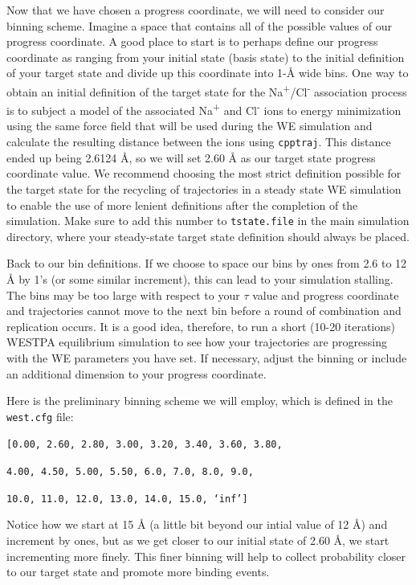 \documentclass[9pt,tutorial]{livecoms}
\begin{document}
Now that we have chosen a progress coordinate, we will need to consider our binning scheme. 
Imagine a space that contains all of the possible values of our progress coordinate. 
A good place to start is to perhaps define our progress coordinate as ranging from your initial state (basis state) to the initial definition of your target state and divide up this coordinate into 1-\AA{} wide bins. 
One way to obtain an initial definition of the target state for the Na\textsuperscript{+}/Cl\textsuperscript{-} association process is to subject a model of the associated Na\textsuperscript{+} and Cl\textsuperscript{-} ions to energy minimization using the same force field that will be used during the WE simulation and calculate the resulting distance between the ions using \verb|cpptraj|. 
This distance ended up being 2.6124 \AA{}, so we will set 2.60 \AA{} as our target state progress coordinate value. 
We recommend choosing the most strict definition possible for the target state for the recycling of trajectories in a steady state WE simulation to enable the use of more lenient definitions after the completion of the simulation. 
Make sure to add this number to \verb|tstate.file| in the main simulation directory, where your steady-state target state definition should always be placed.

Back to our bin definitions. 
If we choose to space our bins by ones from 2.6 to 12 \AA{} by 1’s (or some similar increment), this can lead to your simulation stalling. 
The bins may be too large with respect to your $\tau$ value and progress coordinate and trajectories cannot move to the next bin before a round of combination and replication occurs. 
It is a good idea, therefore, to run a short (10-20 iterations) WESTPA equilibrium simulation to see how your trajectories are progressing with the WE parameters you have set.
If necessary, adjust the binning or include an additional dimension to your progress coordinate.

Here is the preliminary binning scheme we will employ, which is defined in the \verb|west.cfg| file:
 
\verb|[0.00, 2.60, 2.80, 3.00, 3.20, 3.40, 3.60, 3.80,|

\verb|4.00, 4.50, 5.00, 5.50, 6.0, 7.0, 8.0, 9.0,|

\verb|10.0, 11.0, 12.0, 13.0, 14.0, 15.0, ‘inf’]|
        	 
Notice how we start at 15 \AA{} (a little bit beyond our intial value of 12 \AA) and increment by ones, but as we get closer to our initial state of 2.60 \AA, we start incrementing more finely. 
This finer binning will help to collect probability closer to our target state and promote more binding events.
\end{document}
